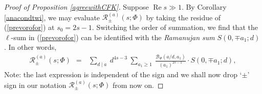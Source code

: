 \documentclass[11pt,reqno]{amsart}
\theoremstyle{definition}
\theoremstyle{definition}
\theoremstyle{remark}
\numberwithin{equation}{section}
\DeclareMathOperator{\re}{Re}
\begin{document}
  



\begin{proof}[Proof of Proposition \ref{agreewithCFK}]
Suppose $\re s\gg 1$.  By Corollary \ref{anacondtwi}, we may evaluate $\mathcal{R}_{\pm}^{(a)}(s; \Phi) $ by taking the residue of (\ref{prevorofor}) at $s_{0}=2s-1$.   Switching the order of summation,  we find that the $\ell$-sum in (\ref{prevorofor}) can be identified with the \textit{Ramanujan sum} $ S(0, \mp a_{1};d)$. In other words,  
\begin{align}\label{resDS}
 \mathcal{R}_{\pm}^{(a)}(s; \Phi)  \ \ =  \ \ 	 \ \sum_{d \mid a} \  d^{4s-3} \
	\sum_{a_{1}\ge 1}  \ \frac{\mathcal{B}_{\Phi}\left( a/d, a_{1}   \right)}{ (a_{1})^{2s-1}} \cdot S(0, \mp a_{1};d),
\end{align}
 Note: the last expression is independent of the sign and we shall now drop `$\pm$' sign in our notation  $\mathcal{R}_{\pm}^{(a)}(s; \Phi)$ from now on. 


\end{proof}
\end{document}
